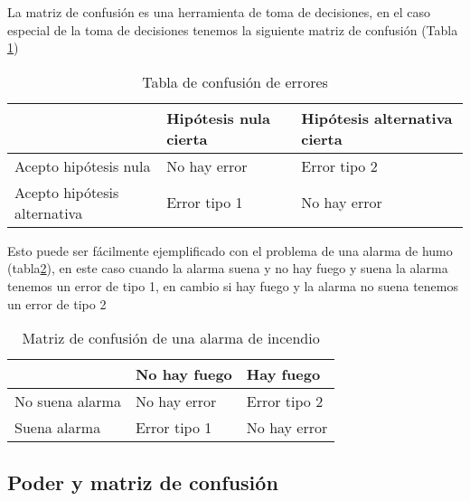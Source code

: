 \documentclass[]{book}
\begin{document}
La matriz de confusión es una herramienta de toma de decisiones, en el caso especial de la toma de decisiones tenemos la siguiente matriz de confusión (Tabla \ref{tab:errores})

\begin{table}[t]

\caption{\label{tab:errores}Tabla de confusión de errores}
\centering
\begin{tabular}{l|l|l}
\hline
  & Hipótesis nula cierta & Hipótesis alternativa cierta\\
\hline
Acepto hipótesis nula & No hay error & Error tipo 2\\
\hline
Acepto hipótesis alternativa & Error tipo 1 & No hay error\\
\hline
\end{tabular}
\end{table}

Esto puede ser fácilmente ejemplificado con el problema de una alarma de humo (tabla\ref{tab:Confucion}), en este caso cuando la alarma suena y no hay fuego y suena la alarma tenemos un error de tipo 1, en cambio si hay fuego y la alarma no suena tenemos un error de tipo 2

\begin{table}[t]

\caption{\label{tab:Confucion}Matriz de confusión de una alarma de incendio}
\centering
\begin{tabular}{lll}
\toprule
  & No hay fuego & Hay fuego\\
\midrule
No suena alarma & No hay error & Error tipo 2\\
Suena alarma & Error tipo 1 & No hay error\\
\bottomrule
\end{tabular}
\end{table}

\hypertarget{poder-y-matriz-de-confusion}{%
\subsection{Poder y matriz de confusión}\label{poder-y-matriz-de-confusion}}
\end{document}
